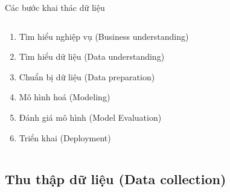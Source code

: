 \documentclass[13spt]{beamer}
\begin{document}
\begin{frame}{Các bước khai thác dữ liệu}
\begin{columns}
\begin{column}{0.5\textwidth}
\begin{small}
	\begin{enumerate}
	\item Tìm hiểu nghiệp vụ (Business understanding) \pause 
	\item Tìm hiểu dữ liệu (Data understanding) \pause 
	\item Chuẩn bị dữ liệu (Data preparation) \pause 
	\item Mô hình hoá (Modeling)
	\item Đánh giá mô hình (Model Evaluation)\pause 
	\item Triển khai (Deployment) 
	\end{enumerate}	
	\end{small}

 \end{column}
 \end{columns}
\end{frame}

\subsection{Thu thập dữ liệu (Data collection)}
\end{document}
